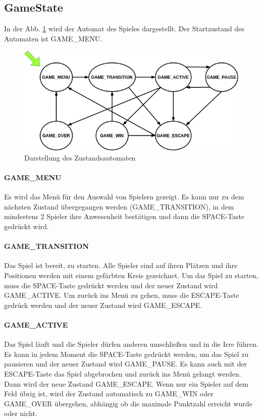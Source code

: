 \documentclass[doktyp=studarbeit]{TUBAFarbeiten}
\begin{document}
\FloatBarrier
\subsection{GameState}

In der Abb. \ref{fig:state-machine} wird der Automat des Spieles dargestellt. 
Der Startzustand des Automaten ist GAME\_MENU. 

\begin{figure}
    \centering
    \includegraphics[width=0.7\linewidth]{state_machine.png}
	\caption{Darstellung des Zustandsautomaten}
	\label{fig:state-machine}
\end{figure}

\paragraph{GAME\_MENU}
Es wird das Menü für den Auswahl von Spielern gezeigt. Es kann nur zu dem
nächsten Zustand übergegangen werden (GAME\_TRANSITION), in dem mindestens 
2 Spieler
ihre Anwesenheit bestätigen und dann die SPACE-Taste gedrückt wird.
\paragraph{GAME\_TRANSITION}
Das Spiel ist bereit, zu starten. Alle Spieler sind auf ihren Plätzen und ihre
Positionen werden mit einem gefärbten Kreis gezeichnet. Um das Spiel zu starten,
muss die SPACE-Taste gedrückt werden und der neuer Zustand wird GAME\_ACTIVE. 
Um zurück ins Menü zu gehen, muss die ESCAPE-Taste gedrück werden und 
der neuer Zustand wird GAME\_ESCAPE.
\paragraph{GAME\_ACTIVE}
Das Spiel läuft und die Spieler dürfen anderen umschließen und in die Irre führen.
Es kann in jedem Moment die SPACE-Taste gedrückt werden, um das Spiel zu pausieren
und der neuer Zustand wird GAME\_PAUSE. Es kann auch mit der ESCAPE-Taste das
Spiel abgebrochen und zurück ins Menü gelangt werden. Dann wird der 
neue Zustand GAME\_ESCAPE. 
Wenn nur ein Spieler auf dem Feld übrig ist, wird der Zustand
automatisch zu GAME\_WIN oder GAME\_OVER übergehen, abhängig ob die maximale 
Punktzahl erreicht wurde oder nicht.
\end{document}
